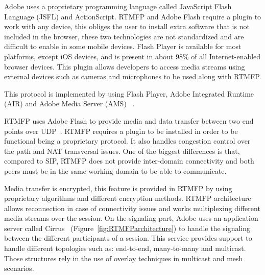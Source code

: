 Adobe uses a proprietary programming language called JavaScript Flash Language (JSFL)  and ActionScript. RTMFP and Adobe Flash require a plugin to work with any device, this obliges the user to install extra software that is not included in the browser, these two technologies are not standardized and are difficult to enable in some mobile devices. Flash Player is available for most platforms, except iOS devices, and is present in about 98\% of all Internet-enabled browser devices. This plugin allows developers to access media streams using external devices such as cameras and microphones to be used along with RTMFP.

This protocol is implemented by using Flash Player, Adobe Integrated Runtime (AIR) and Adobe Media Server (AMS) ~\cite{rtmfpDraft}. 

RTMFP uses Adobe Flash to provide media and data transfer between two end points over UDP~\cite{rtmfpDraft}. RTMFP requires a plugin to be installed in order to be functional being a proprietary protocol. It also handles congestion control over the path and NAT transversal issues. One of the biggest differences is that, compared to SIP, RTMFP does not provide inter-domain connectivity and both peers must be in the same working domain to be able to communicate.

Media transfer is encrypted, this feature is provided in RTMFP by using proprietary algorithms and different encryption methods. RTMFP architecture allows reconnection in case of connectivity issues and works multiplexing different media streams over the session. On the signaling part, Adobe uses an application server called Cirrus~\cite{cirrusFAQ} (Figure~\ref{fig:RTMFParchitecture}) to handle the signaling between the different participants of a session. This service provides support to handle different topologies such as: end-to-end, many-to-many and multicast. Those structures rely in the use of overlay techniques in multicast and mesh scenarios. 
 
